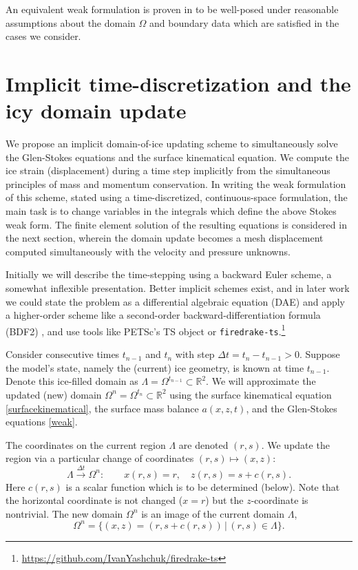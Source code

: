 \documentclass[letterpaper,final,12pt,reqno]{amsart}
\newcommand{\RR}{\mathbb{R}}
\begin{document}
An equivalent weak formulation is proven in \cite[Theorem 3.8]{JouvetRappaz2011} to be well-posed under reasonable assumptions about the domain $\Omega$ and boundary data which are satisfied in the cases we consider.


\section{Implicit time-discretization and the icy domain update} \label{sec:implicitstep}

We propose an implicit domain-of-ice updating scheme to simultaneously solve the Glen-Stokes equations and the surface kinematical equation.  We compute the ice strain (displacement) during a time step implicitly from the simultaneous principles of mass and momentum conservation.  In writing the weak formulation of this scheme, stated using a time-discretized, continuous-space formulation, the main task is to change variables in the integrals which define the above Stokes weak form.  The finite element solution of the resulting equations is considered in the next section, wherein the domain update becomes a mesh displacement computed simultaneously with the velocity and pressure unknowns.

Initially we will describe the time-stepping using a backward Euler scheme, a somewhat inflexible presentation.  Better implicit schemes exist, and in later work we could state the problem as a differential algebraic equation (DAE) and apply a higher-order scheme like a second-order backward-differentiation formula (BDF2) \cite{AscherPetzold1998}, and use tools like PETSc's TS object \cite{Balayetal2020,BuelerBook} or \texttt{firedrake-ts}.\footnote{\url{https://github.com/IvanYashchuk/firedrake-ts}}

Consider consecutive times $t_{n-1}$ and $t_n$ with step $\Delta t = t_n - t_{n-1} > 0$.  Suppose the model's state, namely the (current) ice geometry, is known at time $t_{n-1}$.  Denote this ice-filled domain as $\Lambda = \Omega^{t_{n-1}} \subset \RR^2$.  We will approximate the updated (new) domain $\Omega^n = \Omega^{t_n} \subset \RR^2$ using the surface kinematical equation \eqref{surfacekinematical}, the surface mass balance $a(x,z,t)$, and the Glen-Stokes equations \eqref{weak}.

The coordinates on the current region $\Lambda$ are denoted $(r,s)$.  We update the region via a particular change of coordinates $(r,s) \mapsto (x,z)$:
\begin{equation}
\Lambda \stackrel{\Delta t}{\to} \Omega^n: \qquad x(r,s)=r, \quad z(r,s)=s+c(r,s). \label{changecoords}
\end{equation}
Here $c(r,s)$ is a scalar function which is to be determined (below).  Note that the horizontal coordinate is not changed ($x=r$) but the $z$-coordinate is nontrivial.  The new domain $\Omega^n$ is an image of the current domain $\Lambda$,
\begin{equation}
\Omega^n = \{(x,z)=(r,s+c(r,s)) \,\big|\, (r,s) \in \Lambda\}.  \label{updateddomain}
\end{equation}
\end{document}
